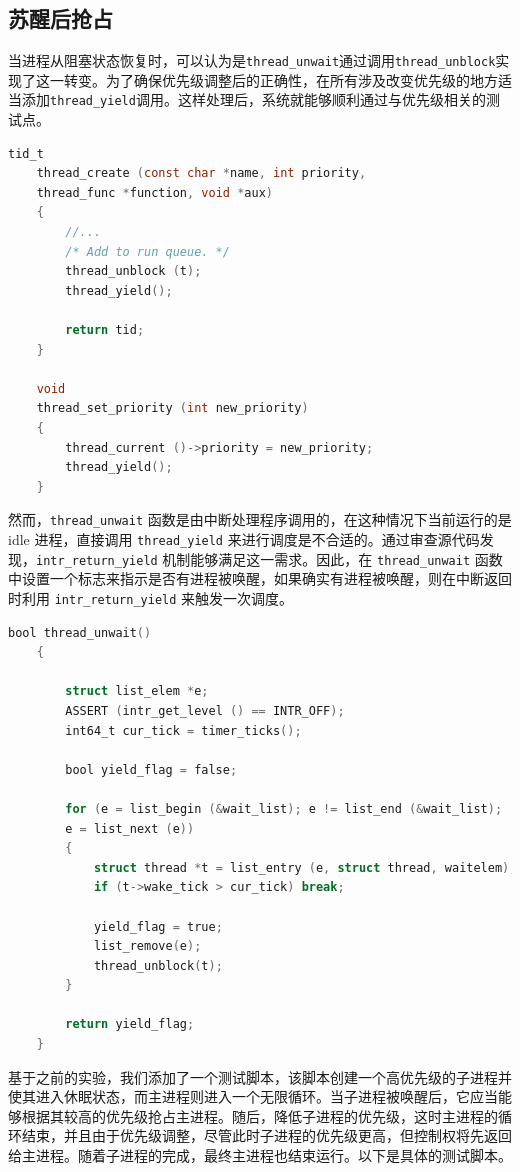 \documentclass{article}
\begin{document}
\subsection{苏醒后抢占}

当进程从阻塞状态恢复时，可以认为是\texttt{thread\_unwait}通过调用\texttt{thread\_unblock}实现了这一转变。为了确保优先级调整后的正确性，在所有涉及改变优先级的地方适当添加\texttt{thread\_yield}调用。这样处理后，系统就能够顺利通过与优先级相关的测试点。

\begin{lstlisting}[language=C, title=\texttt{thread\_create}]
	tid_t
	thread_create (const char *name, int priority,
	thread_func *function, void *aux)
	{
		//...
		/* Add to run queue. */
		thread_unblock (t);
		thread_yield();
		
		return tid;
	}
	
	void
	thread_set_priority (int new_priority)
	{
		thread_current ()->priority = new_priority;
		thread_yield();
	}
\end{lstlisting}

然而，\texttt{thread\_unwait} 函数是由中断处理程序调用的，在这种情况下当前运行的是 idle 进程，直接调用 \texttt{thread\_yield} 来进行调度是不合适的。通过审查源代码发现，\texttt{intr\_return\_yield} 机制能够满足这一需求。因此，在 \texttt{thread\_unwait} 函数中设置一个标志来指示是否有进程被唤醒，如果确实有进程被唤醒，则在中断返回时利用 \texttt{intr\_return\_yield} 来触发一次调度。

\begin{lstlisting}[language=C, title=\texttt{thread\_unwait}]
	bool thread_unwait()
	{ 
		
		struct list_elem *e;
		ASSERT (intr_get_level () == INTR_OFF);
		int64_t cur_tick = timer_ticks();
		
		bool yield_flag = false;
		
		for (e = list_begin (&wait_list); e != list_end (&wait_list);
		e = list_next (e))
		{
			struct thread *t = list_entry (e, struct thread, waitelem);
			if (t->wake_tick > cur_tick) break;
			
			yield_flag = true;
			list_remove(e);
			thread_unblock(t);
		}
		
		return yield_flag;
	}
\end{lstlisting}

基于之前的实验，我们添加了一个测试脚本，该脚本创建一个高优先级的子进程并使其进入休眠状态，而主进程则进入一个无限循环。当子进程被唤醒后，它应当能够根据其较高的优先级抢占主进程。随后，降低子进程的优先级，这时主进程的循环结束，并且由于优先级调整，尽管此时子进程的优先级更高，但控制权将先返回给主进程。随着子进程的完成，最终主进程也结束运行。以下是具体的测试脚本。
\end{document}

